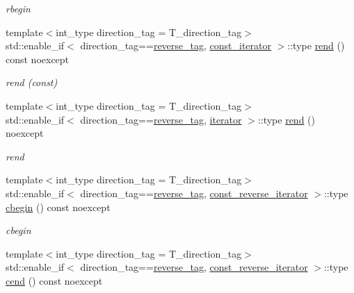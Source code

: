 \begin{DoxyCompactItemize}
\begin{DoxyCompactList}\small\item\em rbegin \end{DoxyCompactList}\item 
{\footnotesize template$<$int\+\_\+type direction\+\_\+tag = T\+\_\+direction\+\_\+tag$>$ }\\std\+::enable\+\_\+if$<$ direction\+\_\+tag==\hyperlink{namespaceIceBRG_a3f2c2517005b9902e3eb97894b072f91a9793d1e2c6b63e17ed62034e78307b63}{reverse\+\_\+tag}, \hyperlink{classIceBRG_1_1labeled__array__vecs_a6003abed56d6f931ce74524cda329972}{const\+\_\+iterator} $>$\+::type \hyperlink{classIceBRG_1_1labeled__array__vecs_ab09541f2a597e6e87c73c709ece9f02f}{rend} () const  noexcept
\begin{DoxyCompactList}\small\item\em rend (const) \end{DoxyCompactList}\item 
{\footnotesize template$<$int\+\_\+type direction\+\_\+tag = T\+\_\+direction\+\_\+tag$>$ }\\std\+::enable\+\_\+if$<$ direction\+\_\+tag==\hyperlink{namespaceIceBRG_a3f2c2517005b9902e3eb97894b072f91a9793d1e2c6b63e17ed62034e78307b63}{reverse\+\_\+tag}, \hyperlink{classIceBRG_1_1labeled__array__vecs_a989cbe0a7bc0b96a206c52ddd3513a23}{iterator} $>$\+::type \hyperlink{classIceBRG_1_1labeled__array__vecs_a1dc9a9fb257c1c6410bab3f2b765fd12}{rend} () noexcept
\begin{DoxyCompactList}\small\item\em rend \end{DoxyCompactList}\item 
{\footnotesize template$<$int\+\_\+type direction\+\_\+tag = T\+\_\+direction\+\_\+tag$>$ }\\std\+::enable\+\_\+if$<$ direction\+\_\+tag==\hyperlink{namespaceIceBRG_a3f2c2517005b9902e3eb97894b072f91a9793d1e2c6b63e17ed62034e78307b63}{reverse\+\_\+tag}, \hyperlink{classIceBRG_1_1labeled__array__vecs_aefecf82bcd5d24b2c6fc29b4f8930054}{const\+\_\+reverse\+\_\+iterator} $>$\+::type \hyperlink{classIceBRG_1_1labeled__array__vecs_a67d12cc0b711b72c4da300909a3a3692}{cbegin} () const  noexcept
\begin{DoxyCompactList}\small\item\em cbegin \end{DoxyCompactList}\item 
{\footnotesize template$<$int\+\_\+type direction\+\_\+tag = T\+\_\+direction\+\_\+tag$>$ }\\std\+::enable\+\_\+if$<$ direction\+\_\+tag==\hyperlink{namespaceIceBRG_a3f2c2517005b9902e3eb97894b072f91a9793d1e2c6b63e17ed62034e78307b63}{reverse\+\_\+tag}, \hyperlink{classIceBRG_1_1labeled__array__vecs_aefecf82bcd5d24b2c6fc29b4f8930054}{const\+\_\+reverse\+\_\+iterator} $>$\+::type \hyperlink{classIceBRG_1_1labeled__array__vecs_ae7aec5a8b78a9135b0815364e4c48951}{cend} () const  noexcept

\end{DoxyCompactItemize}
